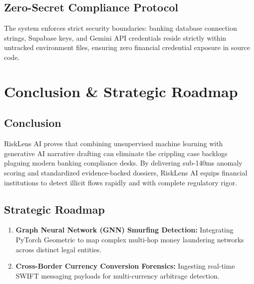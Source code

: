 \documentclass[12pt,a4paper]{report}
\begin{document}
\section{Zero-Secret Compliance Protocol}
The system enforces strict security boundaries: banking database connection strings, Supabase keys, and Gemini API credentials reside strictly within untracked environment files, ensuring zero financial credential exposure in source code.

\chapter{Conclusion \& Strategic Roadmap}

\section{Conclusion}
RiskLens AI proves that combining unsupervised machine learning with generative AI narrative drafting can eliminate the crippling case backlogs plaguing modern banking compliance desks. By delivering sub-140ms anomaly scoring and standardized evidence-backed dossiers, RiskLens AI equips financial institutions to detect illicit flows rapidly and with complete regulatory rigor.

\section{Strategic Roadmap}
\begin{enumerate}[nosep]
    \item \textbf{Graph Neural Network (GNN) Smurfing Detection:} Integrating PyTorch Geometric to map complex multi-hop money laundering networks across distinct legal entities.
    \item \textbf{Cross-Border Currency Conversion Forensics:} Ingesting real-time SWIFT messaging payloads for multi-currency arbitrage detection.
\end{enumerate}
\end{document}

